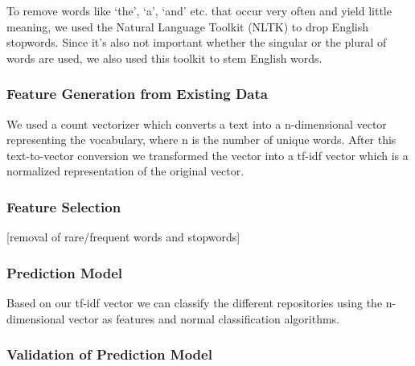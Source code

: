 \documentclass{article}
\begin{document}
To remove words like `the', `a', `and' etc. that occur very often and
yield little meaning, we used the Natural Language Toolkit (NLTK) to
drop English stopwords. Since it's also not important whether the
singular or the plural of words are used, we also used this toolkit to
stem English words.

\subsubsection{Feature Generation from Existing
Data}\label{feature-generation-from-existing-data}

We used a count vectorizer which converts a text into a n-dimensional
vector representing the vocabulary, where n is the number of unique
words. After this text-to-vector conversion we transformed the vector
into a tf-idf vector which is a normalized representation of the
original vector.

\subsubsection{Feature Selection}\label{feature-selection-1}

{[}removal of rare/frequent words and stopwords{]}

\subsubsection{Prediction Model}\label{prediction-model-1}

Based on our tf-idf vector we can classify the different repositories
using the n-dimensional vector as features and normal classification
algorithms.

\subsubsection{Validation of Prediction
Model}\label{validation-of-prediction-model-1}
\end{document}
